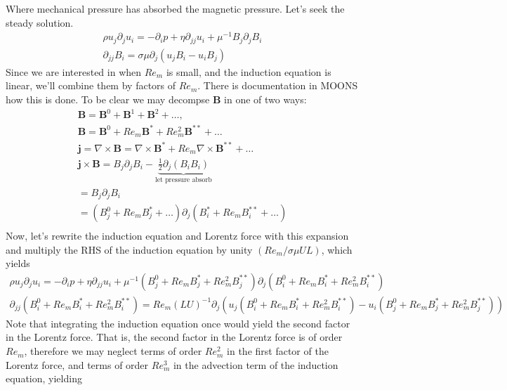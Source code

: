 \documentclass[11pt]{article}
\newcommand{\B}{\mathbf{B}}
\newcommand{\curl}{\nabla \times}
\newcommand{\PD}{\partial}
\newcommand{\J}{\mathbf{j}}
\begin{document}
Where mechanical pressure has absorbed the magnetic pressure. Let's seek the steady solution.
\begin{equation}\begin{aligned}
\rho u_j \PD_j u_i = - \PD_i p + \eta \PD_{jj} u_i + \mu^{-1} B_j \PD_j B_i \\
\PD_{jj} B_i = \sigma \mu \PD_j (u_j B_i - u_i B_j)
\end{aligned} \end{equation}
Since we are interested in when $Re_m$ is small, and the induction equation is linear, we'll combine them by factors of $Re_m$. There is documentation in MOONS how this is done. To be clear we may decompse $\B$ in one of two ways:
\begin{equation}\begin{aligned}
	\B = \B^0 + \B^1 + \B^2 + \hdots , \\
	\B = \B^0 + Re_m \B^* + Re_m^2 \B^{**} + \hdots \\
	\J = \curl \B = \curl \B^* + Re_m \curl \B^{**} + \hdots \\
	\J \times \B = B_j \PD_j B_i - \underbrace{\tfrac{1}{2} \PD_j (B_i B_i)}_{\text{let pressure absorb}} \\
	= B_j \PD_j B_i \\
	= (B_j^0+Re_m B_j^* + \hdots) \PD_j (B_i^*+Re_m B_i^{**} + \hdots) \\
\end{aligned} \end{equation}
Now, let's rewrite the induction equation and Lorentz force with this expansion
and multiply the RHS of the induction equation by unity $(Re_m/\sigma \mu U L)$, which yields
\begin{equation}\begin{aligned}
\rho u_j \PD_j u_i = - \PD_i p + \eta \PD_{jj} u_i + \mu^{-1} (B_j^0 + Re_m B_j^* + Re_m^2 B_j^{**}) \PD_j (B_i^0 + Re_m B_i^* + Re_m^2 B_i^{**}) \\
\PD_{jj} (B_i^0 + Re_m B_i^* + Re_m^2 B_i^{**}) = Re_m (LU)^{-1} \PD_j (u_j (B_i^0 + Re_m B_i^* + Re_m^2 B_i^{**}) - u_i (B_j^0 + Re_m B_j^* + Re_m^2 B_j^{**}))
\end{aligned} \end{equation}
Note that integrating the induction equation once would yield the second factor in the 
Lorentz force. That is, the second factor in the Lorentz force is of order $Re_m$, therefore
we may neglect terms of order $Re_m^2$ in the first factor of the Lorentz force, and terms of 
order $Re_m^3$ in the advection term of the induction equation, yielding
\end{document}
